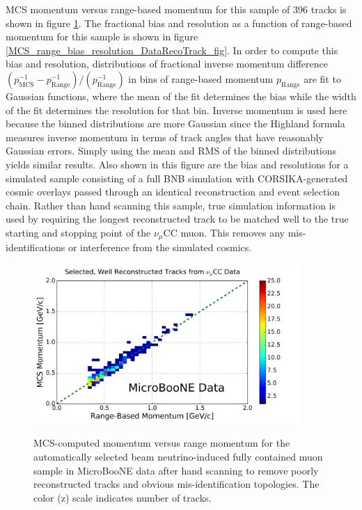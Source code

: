 \documentclass[a4paper,11pt]{article}
\begin{document}
MCS momentum versus range-based momentum for this sample of 396 tracks is shown in figure \ref{realdata_goodhandscan_fig}. The fractional bias and resolution as a function of range-based momentum for this sample is shown in figure \ref{MCS_range_bias_resolution_DataRecoTrack_fig}. In order to compute this bias and resolution, distributions of fractional inverse momentum difference $(p_{\text{MCS}}^{-1} - p_{\text{Range}}^{-1})/(p_{\text{Range}}^{-1})$ in bins of range-based momentum $p_{\text{Range}}$ are fit to Gaussian functions, where the mean of the fit determines the bias while the width of the fit determines the resolution for that bin. Inverse momentum is used here because the binned distributions are more Gaussian since the Highland formula measures inverse momentum in terms of track angles that have reasonably Gaussian errors. Simply using the mean and RMS of the binned distributions yields similar results. Also shown in this figure are the bias and resolutions for a simulated sample consisting of a full BNB simulation with CORSIKA-generated \cite{corsika_ref} cosmic overlays passed through an identical reconstruction and event selection chain. Rather than hand scanning this sample, true simulation information is used by requiring the longest reconstructed track to be matched well to the true starting and stopping point of the $\nu_\mu$CC muon. This removes any mis-identifications or interference from the simulated cosmics. 

\begin{figure}[ht!]
\centering
	\includegraphics[width=0.9\textwidth]{Figures/MCS_range_momentum_DataRecoTracks_goodhandscan.png} \\
\caption{MCS-computed momentum versus range momentum for the automatically selected beam neutrino-induced fully contained muon sample in MicroBooNE data after hand scanning to remove poorly reconstructed tracks and obvious mis-identification topologies. The color (z) scale indicates number of tracks.}\label{realdata_goodhandscan_fig}
\end{figure}
\end{document}
